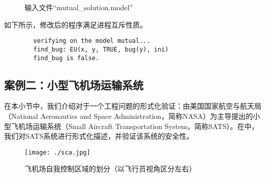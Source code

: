 \begin{example}
\begin{figure}[h!]
\begin{boxedverbatim}
		\end{boxedverbatim}
		\caption{输入文件“mutual\_solution.model”}
		\label{fig:mutual:solution}
	\end{figure}
	
	如下所示，修改后的程序满足进程互斥性质。
	\begin{center}
		\small
		\begin{verbatim}
		verifying on the model mutual...
		find_bug: EU(x, y, TRUE, bug(y), ini)
		find_bug is false.
		\end{verbatim}
	\end{center}
\end{example}

\subsection{案例二：小型飞机场运输系统}\label{subsc:sats}
在本小节中，我们介绍对于一个工程问题的形式化验证：由美国国家航空与航天局（National Aeronautics and Space Administration，简称NASA）为主导提出的小型飞机场运输系统（Small Aircraft Transportation System，简称SATS）\cite{MunozDC04,nasasats04}。在\sctlprov{}中，我们对SATS系统进行形式化描述，并验证该系统的安全性。



\begin{figure}
	\centering
	\texttt{[image: ./sca.jpg]}
	\caption{飞机场自我控制区域的划分（以飞行员视角区分左右）}
	\label{fig:example:sats:sca}
\end{figure}

